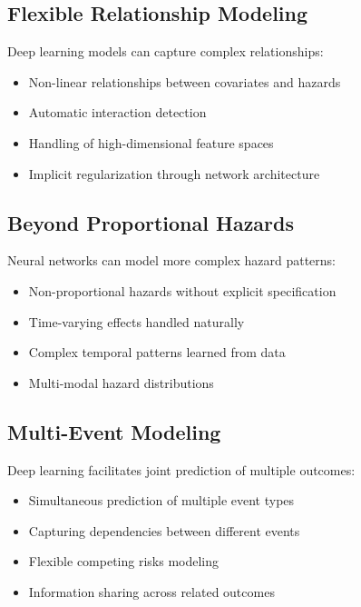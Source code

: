 \subsection{Flexible Relationship Modeling}

Deep learning models can capture complex relationships:

\begin{itemize}
    \item Non-linear relationships between covariates and hazards
    \item Automatic interaction detection
    \item Handling of high-dimensional feature spaces
    \item Implicit regularization through network architecture
\end{itemize}

\subsection{Beyond Proportional Hazards}

Neural networks can model more complex hazard patterns:

\begin{itemize}
    \item Non-proportional hazards without explicit specification
    \item Time-varying effects handled naturally
    \item Complex temporal patterns learned from data
    \item Multi-modal hazard distributions
\end{itemize}

\subsection{Multi-Event Modeling}

Deep learning facilitates joint prediction of multiple outcomes:

\begin{itemize}
    \item Simultaneous prediction of multiple event types
    \item Capturing dependencies between different events
    \item Flexible competing risks modeling
    \item Information sharing across related outcomes
\end{itemize}

